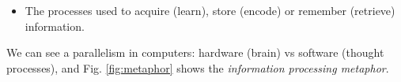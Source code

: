 \begin{itemize}
    \item The processes used to acquire (learn), store (encode) or remember (retrieve) information.
\end{itemize}
We can see a parallelism in computers: hardware (brain) vs software (thought processes), and Fig. \ref{fig:metaphor} shows the\textit{ information processing 
metaphor}.
